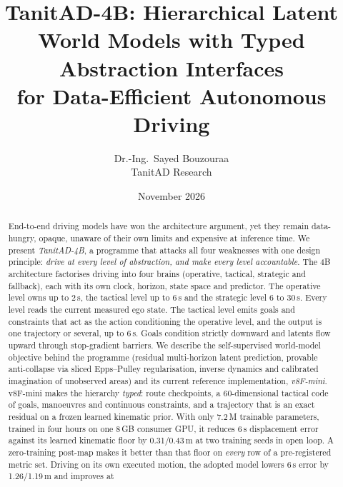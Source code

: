 \documentclass[10pt,twocolumn]{article}
\title{\vspace{-6mm}\textbf{TanitAD-4B: Hierarchical Latent World Models with Typed Abstraction Interfaces\\for Data-Efficient Autonomous Driving}}
\author{Dr.-Ing.\ Sayed Bouzouraa\\[1mm]\normalsize TanitAD Research}
\date{November 2026}
\theoremstyle{remark}
\begin{document}
\maketitle

\begin{abstract}
End-to-end driving models have won the architecture argument, yet they remain data-hungry, opaque, unaware of their own limits and
expensive at inference time. We present \emph{TanitAD-4B}, a programme that attacks all four weaknesses with one design principle:
\emph{drive at every level of abstraction, and make every level accountable}. The 4B architecture factorises driving into four
brains (operative, tactical, strategic and fallback), each with its own clock, horizon, state space and predictor. The operative
level owns up to 2\,s, the tactical level up to 6\,s and the strategic level 6 to 30\,s. Every level reads the current measured ego state.
The tactical level emits goals and constraints that act as the action conditioning the operative level, and the output is one
trajectory or several, up to 6\,s. Goals condition strictly downward and latents flow upward through stop-gradient barriers. We describe the self-supervised world-model objective
behind the programme (residual multi-horizon latent prediction, provable anti-collapse via sliced Epps--Pulley regularisation,
inverse dynamics and calibrated imagination of unobserved areas) and its current reference implementation, \emph{v8F-mini}.
v8F-mini makes the hierarchy \emph{typed}: route checkpoints, a 60-dimensional tactical code of goals, manoeuvres and continuous
constraints, and a trajectory that is an exact residual on a frozen learned kinematic prior. With only 7.2\,M trainable parameters,
trained in four hours on one 8\,GB consumer GPU, it reduces 6\,s displacement error against its learned kinematic floor by
0.31/0.43\,m at two training seeds in open loop. A zero-training post-map makes it better than that floor on \emph{every} row of a
pre-registered metric set. Driving on its own executed motion, the adopted model lowers 6\,s error by 1.26/1.19\,m and improves at

\end{abstract}
\end{document}
